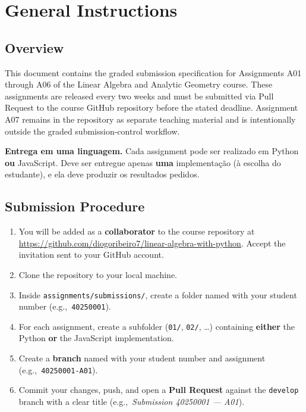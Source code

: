 \documentclass[a4paper,11pt]{article}
\begin{document}
\section{General Instructions}

\subsection{Overview}

This document contains the graded submission specification for Assignments A01 through A06 of the Linear Algebra and Analytic Geometry course. These assignments are released every two weeks and must be submitted via Pull Request to the course GitHub repository before the stated deadline. Assignment A07 remains in the repository as separate teaching material and is intentionally outside the graded submission-control workflow.

\begin{warnbox}
  \textbf{Entrega em uma linguagem.} Cada assignment pode ser realizado em Python \textbf{ou} JavaScript. Deve ser entregue apenas \textbf{uma} implementação (à escolha do estudante), e ela deve produzir os resultados pedidos.
\end{warnbox}

\subsection{Submission Procedure}

\begin{enumerate}[leftmargin=*]
  \item You will be added as a \textbf{collaborator} to the course repository at \url{https://github.com/diogoribeiro7/linear-algebra-with-python}. Accept the invitation sent to your GitHub account.
  \item Clone the repository to your local machine.
  \item Inside \texttt{assignments/submissions/}, create a folder named with your student number (e.g.,~\texttt{40250001}).
  \item For each assignment, create a subfolder (\texttt{01/}, \texttt{02/}, \ldots) containing \textbf{either} the Python \textbf{or} the JavaScript implementation.
  \item Create a \textbf{branch} named with your student number and assignment (e.g.,~\texttt{40250001-A01}).
  \item Commit your changes, push, and open a \textbf{Pull Request} against the \texttt{develop} branch with a clear title (e.g.,~\emph{Submission 40250001 --- A01}).
\end{enumerate}
\end{document}
